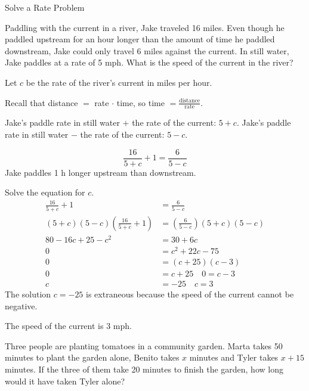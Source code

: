 \documentclass{article}
\newenvironment{concept-box}{}{}        %
\newenvironment{example}[1]{}{}         %
\newenvironment{tryit}[1]{}{}           %
\newcommand{\answer}[1]{}               %
\newcommand{\placeholder}[2]{}          %
\begin{document}
\begin{example}{5}
Solve a Rate Problem

Paddling with the current in a river, Jake traveled 16 miles. Even though he paddled upstream for an hour longer than the amount of time he paddled downstream, Jake could only travel 6 miles against the current. In still water, Jake paddles at a rate of 5 mph. What is the speed of the current in the river?

\placeholder{illustration}{River scene with canoe; labels ``16 miles downstream'' and ``6 miles upstream.''}

Let $c$ be the rate of the river's current in miles per hour.

Recall that distance $=$ rate $\cdot$ time, so time $=\frac{\text{distance}}{\text{rate}}$.

\begin{concept-box}
Jake's paddle rate in still water $+$ the rate of the current: $5+c$. Jake's paddle rate in still water $-$ the rate of the current: $5-c$.
\end{concept-box}

\[
\frac{16}{5+c}+1=\frac{6}{5-c}
\]
Jake paddles 1 h longer upstream than downstream.

Solve the equation for $c$.
\begin{align*}
\frac{16}{5+c}+1 &= \frac{6}{5-c}\\
(5+c)(5-c)\left(\frac{16}{5+c}+1\right) &= \left(\frac{6}{5-c}\right)(5+c)(5-c)\\
80-16c+25-c^2 &= 30+6c\\
0 &= c^2+22c-75\\
0 &= (c+25)(c-3)\\
0 &= c+25\quad 0=c-3\\
c&=-25\quad c=3
\end{align*}
The solution $c=-25$ is extraneous because the speed of the current cannot be negative.

The speed of the current is 3 mph.

\answer{3 mph}
\end{example}

\begin{tryit}{5}
Three people are planting tomatoes in a community garden. Marta takes 50 minutes to plant the garden alone, Benito takes $x$ minutes and Tyler takes $x+15$ minutes. If the three of them take 20 minutes to finish the garden, how long would it have taken Tyler alone?
\answer{75 minutes}
\end{tryit}
\end{document}
